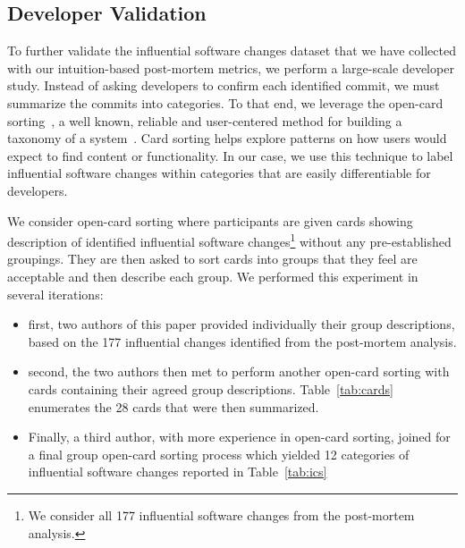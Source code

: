 

\subsection{Developer Validation}
\label{subsec.opencard}

To further validate the influential software changes dataset that we have
collected with our intuition-based post-mortem metrics, we perform a large-scale developer study. Instead of asking developers to confirm each identified
commit, we must summarize the commits into categories. 
To that end, we leverage the open-card sorting~\cite{Nielsen95}, a well known, reliable and
user-centered method for building a taxonomy of a system~\cite{boxesandarrows}.
Card sorting helps explore patterns on how users would expect to find content
or functionality. In our case, we use this technique to label influential
software changes within categories that are easily differentiable for
developers.

We consider open-card sorting where participants are given cards showing
description of identified influential software changes\footnote{We consider
all 177 influential software changes from the post-mortem analysis.} without
any pre-established groupings. They are then asked to sort cards into groups
that they feel are acceptable and then describe each group. We performed this
experiment in several iterations: 
\begin{itemize}
	\item first, two authors of this paper provided individually their group descriptions, based on the 177 influential changes identified from the post-mortem analysis.
	\item  second, the two authors then met to perform another open-card sorting with cards containing their agreed group descriptions. Table~\ref{tab:cards} enumerates the 28 cards that were then summarized.
	\item Finally, a third author, with more experience in open-card sorting, joined for a final group open-card sorting process which yielded 12 categories of influential software changes reported in Table~\ref{tab:ics}
\end{itemize}
 
